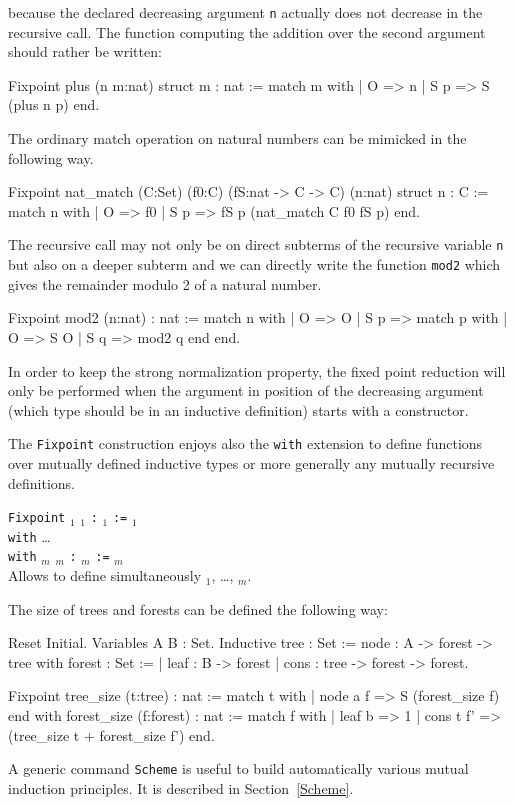 because the declared decreasing argument {\tt n} actually does not
decrease in the recursive call.  The function computing the addition
over the second argument should rather be written:

\begin{coq_example*}
Fixpoint plus (n m:nat) {struct m} : nat :=
  match m with
  | O => n
  | S p => S (plus n p)
  end.
\end{coq_example*}

The ordinary match operation on natural numbers can be mimicked in the
following way.
\begin{coq_example*}
Fixpoint nat_match 
  (C:Set) (f0:C) (fS:nat -> C -> C) (n:nat) {struct n} : C :=
  match n with
  | O => f0
  | S p => fS p (nat_match C f0 fS p)
  end.
\end{coq_example*}
The recursive call may not only be on direct subterms of the recursive
variable {\tt n} but also on a deeper subterm and we can directly
write the function {\tt mod2} which gives the remainder modulo 2 of a
natural number.
\begin{coq_example*}
Fixpoint mod2 (n:nat) : nat :=
  match n with
  | O => O
  | S p => match p with
           | O => S O
           | S q => mod2 q
           end
  end.
\end{coq_example*}
In order to keep the strong normalization property, the fixed point
reduction will only be performed when the argument in position of the
decreasing argument (which type should be in an inductive definition)
starts with a constructor.

The {\tt Fixpoint} construction enjoys also the {\tt with} extension
to define functions over mutually defined inductive types or more
generally any mutually recursive definitions.

\begin{Variants}
\item {\tt Fixpoint} {\ident$_1$} {\params$_1$} {\tt :} {\type$_1$} {\tt :=} {\term$_1$}\\
        {\tt with} {\ldots} \\
        {\tt with} {\ident$_m$} {\params$_m$} {\tt :} {\type$_m$} {\tt :=} {\term$_m$}\\
        Allows to define simultaneously {\ident$_1$}, {\ldots},
        {\ident$_m$}.
\end{Variants}

\Example 
The size of trees and forests can be defined the following way: 
\begin{coq_eval}
Reset Initial.
Variables A B : Set.
Inductive tree : Set :=
    node : A -> forest -> tree
with forest : Set :=
  | leaf : B -> forest
  | cons : tree -> forest -> forest.
\end{coq_eval}
\begin{coq_example*}
Fixpoint tree_size (t:tree) : nat :=
  match t with
  | node a f => S (forest_size f)
  end
 with forest_size (f:forest) : nat :=
  match f with
  | leaf b => 1
  | cons t f' => (tree_size t + forest_size f')
  end.
\end{coq_example*}
A generic command {\tt Scheme} is useful to build automatically various
mutual induction principles. It is described in Section~\ref{Scheme}.


